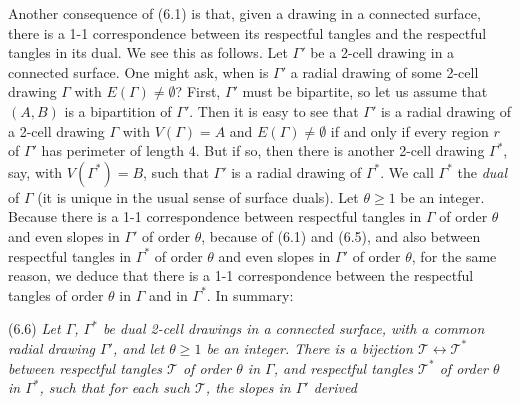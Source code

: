 Another consequence of (6.1) is that, given a drawing in a connected surface, there is a 1-1 correspondence between its respectful tangles and the respectful tangles in its dual. We see this as follows. Let $\Gamma'$ be a 2-cell drawing in a connected surface. One might ask, when is $\Gamma'$ a radial drawing of some 2-cell drawing $\Gamma$ with $E(\Gamma) \ne \emptyset$? First, $\Gamma'$ must be bipartite, so let us assume that $(A, B)$ is a bipartition of $\Gamma'$. Then it is easy to see that $\Gamma'$ is a radial drawing of a 2-cell drawing $\Gamma$ with $V(\Gamma) = A$ and $E(\Gamma) \ne \emptyset$ if and only if every region $r$ of $\Gamma'$ has perimeter of length 4. But if so, then there is another 2-cell drawing $\Gamma^*$, say, with $V(\Gamma^*) = B$, such that $\Gamma'$ is a radial drawing of $\Gamma^*$. We call $\Gamma^*$ the \textit{dual} of $\Gamma$ (it is unique in the usual sense of surface duals). Let $\theta \ge 1$ be an integer. Because there is a 1-1 correspondence between respectful tangles in $\Gamma$ of order $\theta$ and even slopes in $\Gamma'$ of order $\theta$, because of (6.1) and (6.5), and also between respectful tangles in $\Gamma^*$ of order $\theta$ and even slopes in $\Gamma'$ of order $\theta$, for the same reason, we deduce that there is a 1-1 correspondence between the respectful tangles of order $\theta$ in $\Gamma$ and in $\Gamma^*$. In summary:

\stmt
(6.6) \textit{Let $\Gamma$, $\Gamma^*$ be dual 2-cell drawings in a connected surface, with a common radial drawing $\Gamma'$, and let $\theta \ge 1$ be an integer. There is a bijection $\mathscr{T} \leftrightarrow \mathscr{T}^*$ between respectful tangles $\mathscr{T}$ of order $\theta$ in $\Gamma$, and respectful tangles $\mathscr{T}^*$ of order $\theta$ in $\Gamma^*$, such that for each such $\mathscr{T}$, the slopes in $\Gamma'$ derived}
